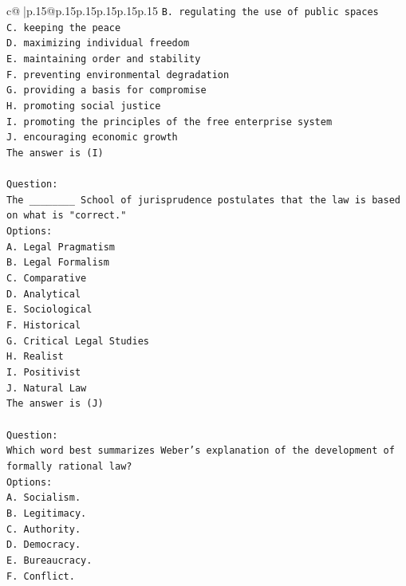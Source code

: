 \documentclass{article}
\begin{document}
{\begin{supertabular}{c@{$\;$}|p{.15\linewidth}@{}p{.15\linewidth}p{.15\linewidth}p{.15\linewidth}p{.15\linewidth}p{.15\linewidth}}
{{{\texttt{B. regulating the use of public spaces} \\
\texttt{C. keeping the peace} \\
\texttt{D. maximizing individual freedom} \\
\texttt{E. maintaining order and stability} \\
\texttt{F. preventing environmental degradation} \\
\texttt{G. providing a basis for compromise} \\
\texttt{H. promoting social justice} \\
\texttt{I. promoting the principles of the free enterprise system} \\
\texttt{J. encouraging economic growth} \\
\texttt{The answer is (I)} \\
\\ 
\texttt{Question:} \\
\texttt{The \_\_\_\_\_\_\_\_ School of jurisprudence postulates that the law is based on what is "correct."} \\
\texttt{Options:} \\
\texttt{A. Legal Pragmatism} \\
\texttt{B. Legal Formalism} \\
\texttt{C. Comparative} \\
\texttt{D. Analytical} \\
\texttt{E. Sociological} \\
\texttt{F. Historical} \\
\texttt{G. Critical Legal Studies} \\
\texttt{H. Realist} \\
\texttt{I. Positivist} \\
\texttt{J. Natural Law} \\
\texttt{The answer is (J)} \\
\\ 
\texttt{Question:} \\
\texttt{Which word best summarizes Weber's explanation of the development of formally rational law?} \\
\texttt{Options:} \\
\texttt{A. Socialism.} \\
\texttt{B. Legitimacy.} \\
\texttt{C. Authority.} \\
\texttt{D. Democracy.} \\
\texttt{E. Bureaucracy.} \\
\texttt{F. Conflict.} \\
}}}
\end{supertabular}}
\end{document}
